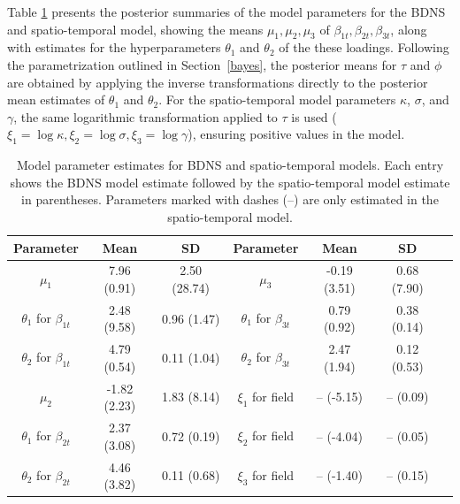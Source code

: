 \documentclass[
  12pt]{article}
\begin{document}
Table \ref{model} presents the posterior summaries of the model parameters for the BDNS and spatio-temporal model, showing the means $\mu_1,\mu_2,\mu_3$ of $\beta_{1t}, \beta_{2t}, \beta_{3t}$, along with estimates for the hyperparameters $\theta_1$ and $\theta_2$ of the these loadings. Following the parametrization outlined in Section~\ref{bayes}, the posterior means for $\tau$ and $\phi$ are obtained by applying the inverse transformations directly to the posterior mean estimates of $\theta_1$ and $\theta_2$. For the spatio-temporal model parameters $\kappa$, $\sigma$, and $\gamma$, the same logarithmic transformation applied to $\tau$ is used ($\xi_1 = \log \kappa, \xi_2 = \log \sigma, \xi_3 = \log \gamma$), ensuring positive values in the model.

\begin{table}[t!]
    \centering
    \small
    \setlength{\tabcolsep}{3pt}
    \caption{Model parameter estimates for BDNS and spatio-temporal models. Each entry shows the BDNS model estimate followed by the spatio-temporal model estimate in parentheses. Parameters marked with dashes (--) are only estimated in the spatio-temporal model.}
    \begin{tabular}{ccccccl}
        \hline
        Parameter & Mean & SD & Parameter & Mean & SD \\
        \hline
        $\mu_1$ & 7.96 (0.91) & 2.50 (28.74) & $\mu_3$ & -0.19 (3.51) & 0.68 (7.90) \\
        $\theta_1$ for $\beta_{1t}$ & 2.48 (9.58) & 0.96 (1.47) & $\theta_1$ for $\beta_{3t}$ & 0.79 (0.92) & 0.38 (0.14) \\
        $\theta_2$ for $\beta_{1t}$ & 4.79 (0.54) & 0.11 (1.04) & $\theta_2$ for $\beta_{3t}$ & 2.47 (1.94) & 0.12 (0.53) \\
        $\mu_2$ & -1.82 (2.23) & 1.83 (8.14) & $\xi_1$ for field & -- (-5.15) & -- (0.09) \\
        $\theta_1$ for $\beta_{2t}$ & 2.37 (3.08) & 0.72 (0.19) & $\xi_2$ for field & -- (-4.04) & -- (0.05) \\
        $\theta_2$ for $\beta_{2t}$ & 4.46 (3.82) & 0.11 (0.68) & $\xi_3$ for field & -- (-1.40) & -- (0.15) \\
        \hline
    \end{tabular}
    \label{model}
\end{table}
\end{document}
